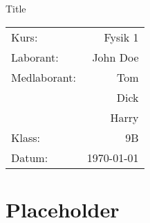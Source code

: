 \documentclass[a4paper]{article}
\begin{document}
\begin{titlepage}%
	\vspace*{\fill}
	\centering
	{\huge Title}
	\vspace{\fill}

	\begin{flushright}
		\begin{tabular}{ lr }
			Kurs: & Fysik 1 \\
			Laborant: & John Doe \\
			Medlaborant: &
			Tom \\
			& Dick \\
			& Harry \\
			Klass: & 9B \\
			Datum: & \today \\
		\end{tabular}
	\end{flushright}
\end{titlepage}%

\begin{abstract}
	\blindtext
\end{abstract}

\newpage

\tableofcontents

\newpage

\section{Placeholder}
\blindtext
\cite{example2021}

\printbibliography
\end{document}
